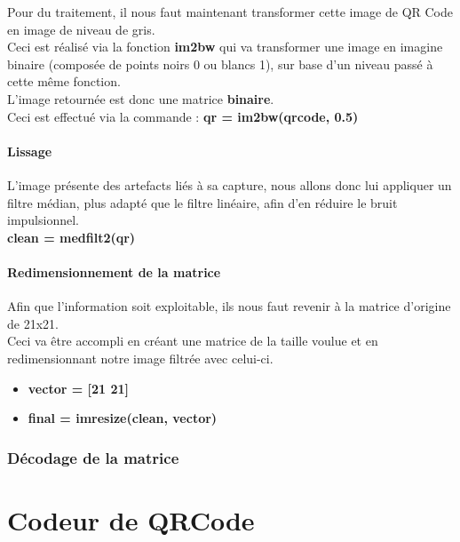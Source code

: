 \documentclass{report}
\begin{document}
				Pour du traitement, il nous faut maintenant transformer cette image de QR Code en image de niveau de gris.\\

				Ceci est réalisé via la fonction \textbf{im2bw} qui va transformer une image en imagine binaire (composée de points noirs 0 ou blancs 1), sur base d'un niveau passé à cette même fonction.\\
				L'image retournée est donc une matrice \textbf{binaire}.\\

				Ceci est effectué via la commande : \textbf{qr = im2bw(qrcode, 0.5)}

			\subsubsection{Lissage}

				L'image présente des artefacts liés à sa capture, nous allons donc lui appliquer un filtre médian, plus adapté que le filtre linéaire, afin d'en réduire le bruit impulsionnel.\\

				\textbf{clean = medfilt2(qr)}

			\subsubsection{Redimensionnement de la matrice}

				Afin que l'information soit exploitable, ils nous faut revenir à la matrice d'origine de 21x21.\\
				Ceci va être accompli en créant une matrice de la taille voulue et en redimensionnant notre image filtrée avec celui-ci.\\

				\begin{itemize}
					\item \textbf{vector = [21 21]}
					\item \textbf{final = imresize(clean, vector)}
				\end{itemize}


		\subsection{Décodage de la matrice}


\chapter{Codeur de QRCode}
	
\end{document}
